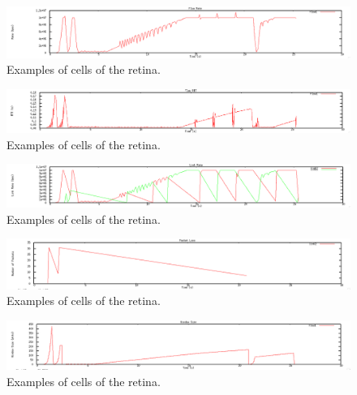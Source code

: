 \documentclass[12pt]{article}
\begin{document}
\begin{figure}[t]
\centering \includegraphics[scale=.35]{figures/Test1_Tahoe/flow_rate.png}
\caption{Examples of cells of the retina.}
\label{fig:test1_tahoe_flow_rate}
\end{figure}

\begin{figure}[t]
\centering \includegraphics[scale=.35]{figures/Test1_Tahoe/flow_rtt.png}
\caption{Examples of cells of the retina.}
\label{fig:test1_tahoe_flow_rtt}
\end{figure}

\begin{figure}[t]
\centering \includegraphics[scale=.35]{figures/Test1_Tahoe/link_rate.png}
\caption{Examples of cells of the retina.}
\label{fig:test1_tahoe_link_rate}
\end{figure}

\begin{figure}[t]
\centering \includegraphics[scale=.35]{figures/Test1_Tahoe/packet_loss.png}
\caption{Examples of cells of the retina.}
\label{fig:test1_tahoe_packet_loss}
\end{figure}

\begin{figure}[t]
\centering \includegraphics[scale=.35]{figures/Test1_Tahoe/window_size.png}
\caption{Examples of cells of the retina.}
\label{fig:test1_tahoe_window_size}
\end{figure}
\end{document}
